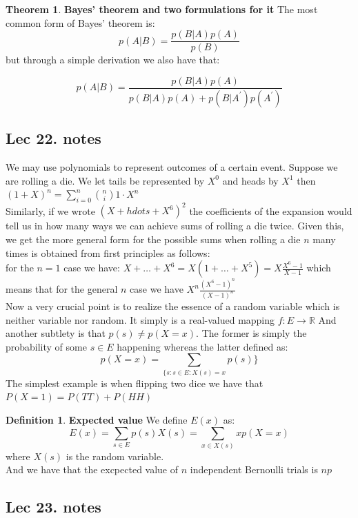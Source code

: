 \documentclass[titlepage]{article}
\theoremstyle{definition}
\newtheorem{theorem}{Theorem}[section]
\newtheorem{definition}{Definition}
\numberwithin{equation}{subsection}
\numberwithin{remark}{subsection}
\begin{document}
\begin{theorem}\textbf{Bayes' theorem and two formulations for it}
The most common form of Bayes' theorem is:
$$p(A|B) = \frac{p(B|A)p(A)}{p(B)}$$ but through a simple derivation we also have that: 

$$ p(A|B) = \frac{p(B|A)p(A)}{p(B|A)p(A) + p(B|A^{'})p(A^{'})} $$
\end{theorem}

\subsection{Lec 22. notes}

We may use polynomials to represent outcomes of a certain event. Suppose we are rolling a die. We let tails be represented by $X^{0}$ and heads by $X^{1}$ then $(1+X)^{n} = \sum_{i=0}^{n}\binom{n}{i}1\cdot X^{n}$ 
\\

Similarly, if we wrote $(X + hdots + X^{6})^{2}$ the coefficients of the expansion would tell us in how many ways we can achieve sums of rolling a die twice. Given this, we get the more general form for the possible sums when rolling a die $n$ many times is obtained from first principles as follows:
\\
for the $n = 1$ case we have: 
$X + \hdots + X^{6} = X(1 + \hdots + X^{5}) = X \frac{X^{6}-1}{X-1}$ which means that for the general $n$ case we have $X^{n} \frac{(X^{6}-1)^{n}}{(X-1)^{n}}$
\\

Now a very crucial point is to realize the essence of a random variable which is neither variable nor random. It simply is a real-valued mapping $f: E \to \mathbb{R}$ And another subtlety is that $p(s) \not= p(X = x)$. The former is simply the probability of some $s \in E$ happening whereas the latter defined as:
$$p(X = x) = \sum_{\{s: s\in E: X(s) = x}p(s)\}$$ The simplest example is when flipping two dice we have that $P(X = 1) = P(TT) + P(HH)$

\begin{definition}\textbf{Expected value}
We define $E(x)$ as:
$$E(x) = \sum_{s\in E} p(s)X(s) = \sum_{x\in X(s)} xp(X=x) $$
where $X(s)$ is the random variable. 
\\

And we have that the excpected value of $n$ independent Bernoulli trials is $np$
\end{definition}

\subsection{Lec 23. notes}
\end{document}
